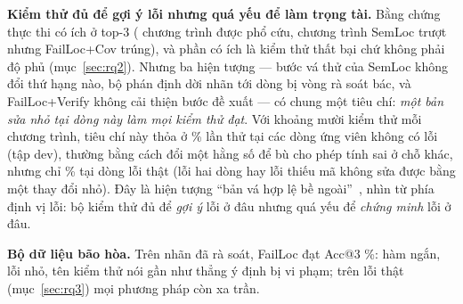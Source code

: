 \textbf{Kiểm thử đủ để gợi ý lỗi nhưng quá yếu để làm trọng tài.} Bằng chứng thực thi có ích ở top-3
(\FailRescuedBySpectrumN{} chương trình được phổ cứu, \FailCoverageOnlyWinsN{} chương trình SemLoc trượt nhưng FailLoc+Cov trúng), và
phần có ích là kiểm thử thất bại chứ không phải độ phủ (mục~\ref{sec:rq2}). Nhưng ba hiện tượng --- bước vá thử của SemLoc
không đổi thứ hạng nào, bộ phán định dời \ReviewCorrectedOverturnedN{} nhãn tới dòng bị vòng rà soát bác, và FailLoc+Verify
không cải thiện bước đề xuất --- có chung một tiêu chí: \emph{một bản sửa nhỏ tại dòng này làm mọi kiểm thử đạt}. Với
khoảng mười kiểm thử mỗi chương trình, tiêu chí này thỏa ở \PavmechReviewedOtherLineFixable\% lần thử tại các dòng ứng
viên không có lỗi (tập dev), thường bằng cách đổi một hằng số để bù cho phép tính sai ở chỗ khác, nhưng chỉ
\PavmechReviewedFaultLineFixable\% tại dòng lỗi thật (lỗi hai dòng hay lỗi thiếu mã không sửa được bằng một thay đổi nhỏ).
Đây là hiện tượng ``bản vá hợp lệ bề ngoài''~\cite{qi2015kali,smith2015cure}, nhìn từ phía định vị lỗi: bộ kiểm thử đủ
để \emph{gợi ý} lỗi ở đâu nhưng quá yếu để \emph{chứng minh} lỗi ở đâu.

\textbf{Bộ dữ liệu bão hòa.} Trên nhãn đã rà soát, FailLoc đạt Acc@3 \RqTwoReviewedAllLlmTestsAccThreeMean\%: hàm ngắn,
lỗi nhỏ, tên kiểm thử nói gần như thẳng ý định bị vi phạm; trên lỗi thật (mục~\ref{sec:rq3}) mọi phương pháp còn xa trần.
